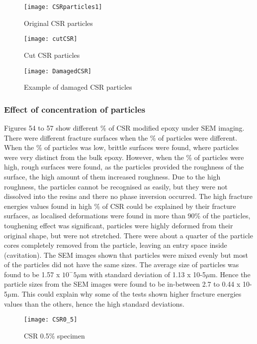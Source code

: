 \documentclass[numbers=noendperiod,chapterprefix=on]{icldt} %
\begin{document}
\begin{figure}[!htpb]
\centering
\texttt{[image: CSRparticles1]}
\caption{Original CSR particles}
\end{figure}
\FloatBarrier

\begin{figure}[!htpb]
\centering
\texttt{[image: cutCSR]}
\caption{Cut CSR particles }
\end{figure}
\FloatBarrier

\begin{figure}[!htpb]
\centering
\texttt{[image: DamagedCSR]}
\caption{Example of damaged CSR particles }
\end{figure}
\FloatBarrier

\subsubsection{Effect of concentration of particles}
Figures 54 to 57 show different \% of CSR modified epoxy under SEM imaging. There were different fracture surfaces when the \% of particles were different. When the \% of particles was low, brittle surfaces were found, where particles were very distinct from the bulk epoxy. However, when the \% of particles were high, rough surfaces were found, as the particles provided the roughness of the surface, the high amount of them increased roughness. Due to the high roughness, the particles cannot be recognised as easily, but they were not dissolved into the resins and there no phase inversion occurred. The high fracture energies values found in high \% of CSR could be explained by their fracture surfaces, as localised deformations were found in more than 90\% of the particles, toughening effect was significant, particles were highly deformed from their original shape, but were not stretched. There were about a quarter of the particle cores completely removed from the particle, leaving an entry space inside (cavitation). The SEM images shown that particles were mixed evenly but most of the particles did not have the same sizes. The average size of particles was found to be 1.57 x $10^-5\mu$m with standard deviation of 1.13 x 10-5$\mu$m. Hence the particle sizes from the SEM images were found to be in-between 2.7 to 0.44 x 10-5$\mu$m. This could explain why some of the tests shown higher fracture energies values than the others, hence the high standard deviations. 

\begin{figure}[!hp]
\centering
\texttt{[image: CSR0\_5]}
\caption{CSR 0.5\% specimen}
\end{figure}
\FloatBarrier
\end{document}

